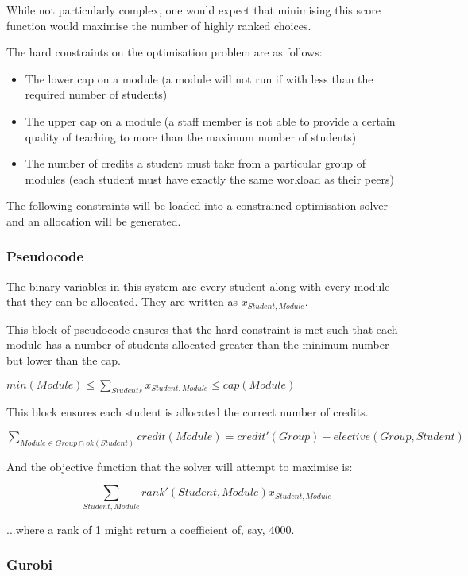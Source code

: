 While not particularly complex, one would expect that minimising this score
function would maximise the number of highly ranked choices.

The hard constraints on the optimisation problem are as follows:

\begin{itemize}
  \item The lower cap on a module (a module will not run if with less than the
        required number of students)
  \item The upper cap on a module (a staff member is not able to provide a
        certain quality of teaching to more than the maximum number of
        students)
  \item The number of credits a student must take from a particular group of
        modules (each student must have exactly the same workload as their
        peers)
\end{itemize}

The following constraints will be loaded into a constrained optimisation
solver and an allocation will be generated.

\subsubsection{Pseudocode}

The binary variables in this system are every student along with every module
that they can be allocated. They are written as $x_{Student,Module}$.

This block of pseudocode ensures that the hard constraint is met such that
each module has a number of students allocated greater than the minimum number
but lower than the cap.

\begin{algorithmic}
  \STATE $min(Module) \leq \displaystyle\sum_{Students}x_{Student,Module} \leq cap(Module)$
\ENDFOR
\end{algorithmic}

This block ensures each student is allocated the correct number of credits.

\begin{algorithmic}
    \STATE $\displaystyle\sum_{Module \in Group \cap ok(Student)} credit(Module) = credit'(Group) - elective(Group,Student)$
  \ENDFOR
\ENDFOR
\end{algorithmic}

And the objective function that the solver will attempt to maximise is:

$$\displaystyle\sum_{Student, Module} rank'(Student, Module)x_{Student, Module}$$

...where a rank of 1 might return a coefficient of, say, 4000.

\subsubsection{Gurobi}
